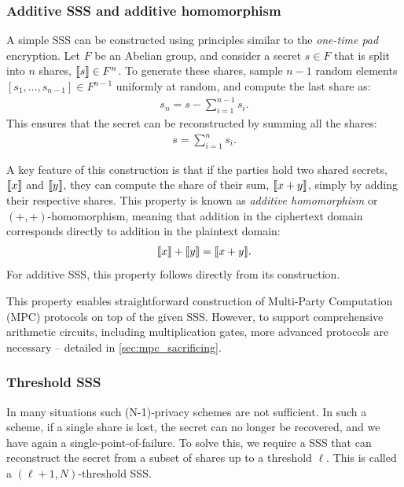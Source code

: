 \documentclass[11pt]{report}
\theoremstyle{definition}
\theoremstyle{plain}
\begin{document}
\subsubsection{Additive SSS and additive homomorphism}\label{sec:additive-sss}

A simple SSS can be constructed using principles similar to the \textit{one-time pad} encryption. Let $F$ be an Abelian group, and consider a secret $s \in F$ that is split into $n$ shares, $\llbracket s \rrbracket \in F^n$. To generate these shares, sample $n-1$ random elements $[s_1, \dots, s_{n-1}] \in F^{n-1}$ uniformly at random, and compute the last share as:
\begin{align*}
  s_n = s - \sum_{i=1}^{n-1} s_i.
\end{align*}
This ensures that the secret can be reconstructed by summing all the shares:
\begin{align*}
  s = \sum_{i=1}^n s_i.
\end{align*}

A key feature of this construction is that if the parties hold two shared secrets, $\llbracket x \rrbracket$ and $\llbracket y \rrbracket$, they can compute the share of their sum, $\llbracket x + y \rrbracket$, simply by adding their respective shares. This property is known as \textit{additive homomorphism} or $(+, +)$-homomorphism, meaning that addition in the ciphertext domain corresponds directly to addition in the plaintext domain:
\begin{align*}
  \llbracket x \rrbracket + \llbracket y \rrbracket = \llbracket x + y \rrbracket.
\end{align*}
For additive SSS, this property follows directly from its construction.

This property enables straightforward construction of Multi-Party Computation (MPC) protocols on top of the given SSS\@. However, to support comprehensive arithmetic circuits, including multiplication gates, more advanced protocols are necessary -- detailed in \autoref{sec:mpc_sacrificing}.

\subsubsection{Threshold SSS}\label{sub:threshold-sss}

In many situations such (N-1)-privacy schemes are not sufficient. In such a scheme, if a single share is lost, the secret can no longer be recovered, and we have again a single-point-of-failure. To solve this, we require a SSS that can reconstruct the secret from a subset of shares up to a threshold $\ell$. This is called a $(\ell + 1, N)$-threshold SSS\@.
\end{document}
